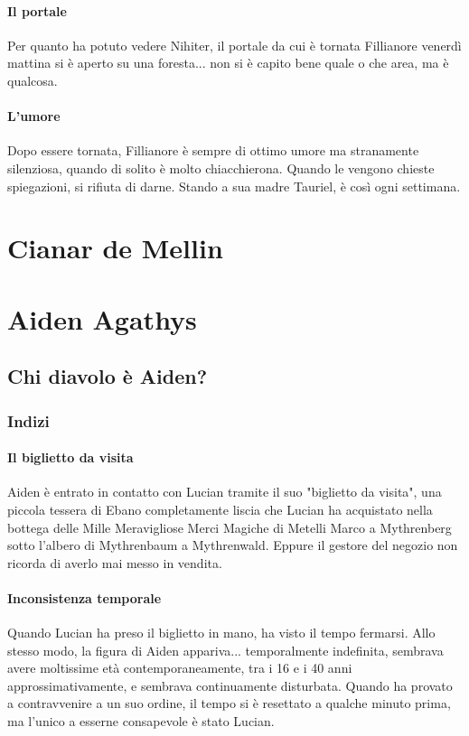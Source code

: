 \documentclass[letterpaper,twocolumn,openany,nodeprecatedcode]{dndbook}
\begin{document}
\paragraph{Il portale} Per quanto ha potuto vedere Nihiter, il portale da cui è tornata Fillianore venerdì mattina si è aperto su una foresta... non si è capito bene quale o che area, ma è qualcosa.
\paragraph{L'umore} Dopo essere tornata, Fillianore è sempre di ottimo umore ma stranamente silenziosa, quando di solito è molto chiacchierona. Quando le vengono chieste spiegazioni, si rifiuta di darne. Stando a sua madre Tauriel, è così ogni settimana.

\section{Cianar de Mellin}

\section{Aiden Agathys}

\subsection{Chi diavolo è Aiden?}

\subsubsection{Indizi}
\paragraph{Il biglietto da visita} Aiden è entrato in contatto con Lucian tramite il suo "biglietto da visita", una piccola tessera di Ebano completamente liscia che Lucian ha acquistato nella bottega delle Mille Meravigliose Merci Magiche di Metelli Marco a Mythrenberg sotto l'albero di Mythrenbaum a Mythrenwald. Eppure il gestore del negozio non ricorda di averlo mai messo in vendita.
\paragraph{Inconsistenza temporale} Quando Lucian ha preso il biglietto in mano, ha visto il tempo fermarsi. Allo stesso modo, la figura di Aiden appariva... temporalmente indefinita, sembrava avere moltissime età contemporaneamente, tra i 16 e i 40 anni approssimativamente, e sembrava continuamente disturbata. Quando ha provato a contravvenire a un suo ordine, il tempo si è resettato a qualche minuto prima, ma l'unico a esserne consapevole è stato Lucian.
\end{document}
